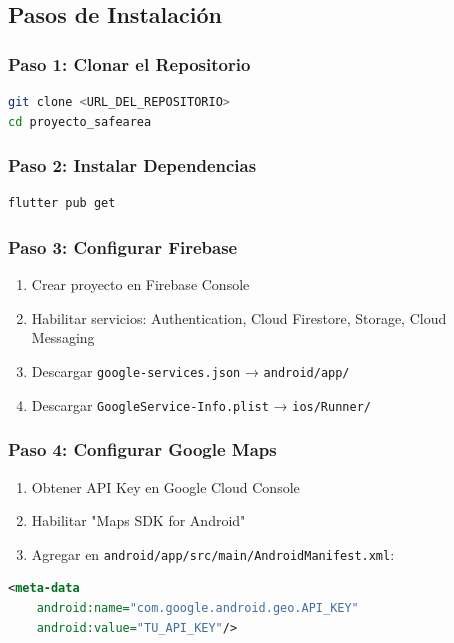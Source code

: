 \documentclass[12pt,a4paper]{article}
\begin{document}
\subsection{Pasos de Instalación}

\subsubsection{Paso 1: Clonar el Repositorio}
\begin{lstlisting}[language=bash]
git clone <URL_DEL_REPOSITORIO>
cd proyecto_safearea
\end{lstlisting}

\subsubsection{Paso 2: Instalar Dependencias}
\begin{lstlisting}[language=bash]
flutter pub get
\end{lstlisting}

\subsubsection{Paso 3: Configurar Firebase}
\begin{enumerate}
    \item Crear proyecto en Firebase Console
    \item Habilitar servicios: Authentication, Cloud Firestore, Storage, Cloud Messaging
    \item Descargar \texttt{google-services.json} → \texttt{android/app/}
    \item Descargar \texttt{GoogleService-Info.plist} → \texttt{ios/Runner/}
\end{enumerate}

\subsubsection{Paso 4: Configurar Google Maps}
\begin{enumerate}
    \item Obtener API Key en Google Cloud Console
    \item Habilitar "Maps SDK for Android"
    \item Agregar en \texttt{android/app/src/main/AndroidManifest.xml}:
\end{enumerate}

\begin{lstlisting}[language=xml]
<meta-data
    android:name="com.google.android.geo.API_KEY"
    android:value="TU_API_KEY"/>
\end{lstlisting}
\end{document}
